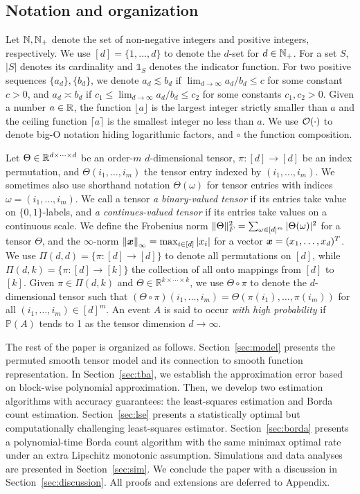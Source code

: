 \documentclass[12pt]{article}
\theoremstyle{definition}
\begin{document}
\subsection{Notation and organization}
Let $\mathbb{N}, \mathbb{N}_{+}$ denote the set of non-negative integers and positive integers, respectively. We use $[d]=\{1,\ldots,d\}$ to denote the $d$-set for $d\in\mathbb{N}_{+}$. For a set $S$, $|S|$ denotes its cardinality and $\mathds{1}_S$ denotes the indicator function. For two positive sequences $\{a_d\},\{b_d\}$,  we denote $a_d\lesssim b_d$ if $\lim_{d\to\infty} a_d/b_d\leq c$ for some constant $c>0$, and $a_d\asymp b_d$ if $c_1\leq \lim_{d\to \infty} a_d/b_d\leq c_2$ for some constants $c_1,c_2>0$. {\color{blue}Given a number $a\in\mathbb{R}$, the  function $\lfloor a\rfloor$ is the largest integer strictly smaller than $a$} and the ceiling function $\lceil a\rceil$ is the smallest integer no less than $a$. We use $\mathcal{O}(\cdot)$ to denote big-O notation hiding logarithmic factors, and $\circ$ the function composition. 

Let $\Theta\in\mathbb{R}^{d\times \cdots \times d}$ be an order-$m$ $d$-dimensional tensor, $\pi\colon[d]\rightarrow[d]$ be an index permutation, and $\Theta(i_1,\ldots,i_m)$ the tensor entry indexed by $(i_1,\ldots,i_m)$. We sometimes also use shorthand notation $\Theta(\omega)$ for tensor entries with indices $\omega=(i_1,\ldots,i_m)$. We call a tensor \emph{a binary-valued tensor} if its entries take value on $\{0,1\}$-labels, and \emph{a continues-valued tensor} if its entries take values on a continuous scale. We define the Frobenius norm $\lVert\Theta\rVert_F^2=\sum_{\omega\in[d]^m}|\Theta(\omega)|^2$ for a tensor $\Theta$, and the $\infty$-norm $\left\lVert\bm x\right\rVert_\infty=\max_{i\in[d]}|x_i|$ for a vector $\bm x=(x_1,\ldots,x_d)^T$.
We use $\Pi(d,d)=\{\pi\colon [d]\to[d]\}$ to denote all permutations on $[d]$, while $\Pi(d,k)=\{\pi\colon [d]\to[k]\}$ the collection of all onto mappings from $[d]$ to $[k]$. Given $\pi\in\Pi(d,k)$ and $\Theta\in\mathbb{R}^{k\times \cdots \times k}$, we use $\Theta\circ\pi$ to denote the $d$-dimensional tensor such that $(\Theta\circ\pi)(i_1,\ldots,i_m) = \Theta(\pi(i_1),\ldots,\pi(i_m))$ for all $(i_1,\ldots,i_m)\in[d]^m$. An event $A$ is said to occur \emph{with high probability} if $\mathbb{P}(A)$ tends to 1 as the tensor dimension $d\to\infty$. 


The rest of the paper is organized as follows. Section~\ref{sec:model} presents the permuted smooth tensor model and its connection to smooth function representation. In Section~\ref{sec:tba}, we establish the approximation error based on block-wise polynomial approximation. Then, we develop two estimation algorithms with accuracy guarantees: the least-squares estimation and Borda count estimation. Section~\ref{sec:lse} presents a statistically optimal but computationally challenging least-squares estimator. Section~\ref{sec:borda} presents a polynomial-time Borda count algorithm with the same minimax optimal rate under {\color{blue}an extra Lipschitz monotonic assumption}. Simulations and data analyses are presented in Section~\ref{sec:sim}. We conclude the paper with a discussion in Section~\ref{sec:discussion}. All proofs and extensions are deferred to Appendix. 
\end{document}
